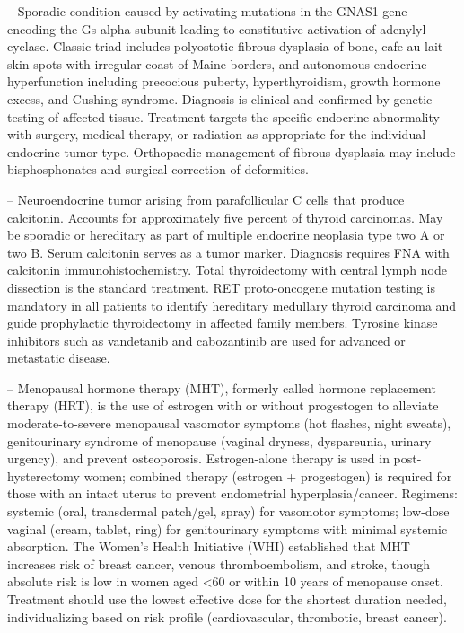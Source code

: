-- Sporadic condition caused by activating mutations in the GNAS1 gene encoding the Gs alpha subunit leading to constitutive activation of adenylyl cyclase. Classic triad includes polyostotic fibrous dysplasia of bone, cafe-au-lait skin spots with irregular coast-of-Maine borders, and autonomous endocrine hyperfunction including precocious puberty, hyperthyroidism, growth hormone excess, and Cushing syndrome. Diagnosis is clinical and confirmed by genetic testing of affected tissue. Treatment targets the specific endocrine abnormality with surgery, medical therapy, or radiation as appropriate for the individual endocrine tumor type. Orthopaedic management of fibrous dysplasia may include bisphosphonates and surgical correction of deformities.

-- Neuroendocrine tumor arising from parafollicular C cells that produce calcitonin. Accounts for approximately five percent of thyroid carcinomas. May be sporadic or hereditary as part of multiple endocrine neoplasia type two A or two B. Serum calcitonin serves as a tumor marker. Diagnosis requires FNA with calcitonin immunohistochemistry. Total thyroidectomy with central lymph node dissection is the standard treatment. RET proto-oncogene mutation testing is mandatory in all patients to identify hereditary medullary thyroid carcinoma and guide prophylactic thyroidectomy in affected family members. Tyrosine kinase inhibitors such as vandetanib and cabozantinib are used for advanced or metastatic disease.

-- Menopausal hormone therapy (MHT), formerly called hormone replacement therapy (HRT), is the use of estrogen with or without progestogen to alleviate moderate-to-severe menopausal vasomotor symptoms (hot flashes, night sweats), genitourinary syndrome of menopause (vaginal dryness, dyspareunia, urinary urgency), and prevent osteoporosis. Estrogen-alone therapy is used in post-hysterectomy women; combined therapy (estrogen + progestogen) is required for those with an intact uterus to prevent endometrial hyperplasia/cancer. Regimens: systemic (oral, transdermal patch/gel, spray) for vasomotor symptoms; low-dose vaginal (cream, tablet, ring) for genitourinary symptoms with minimal systemic absorption. The Women's Health Initiative (WHI) established that MHT increases risk of breast cancer, venous thromboembolism, and stroke, though absolute risk is low in women aged <60 or within 10 years of menopause onset. Treatment should use the lowest effective dose for the shortest duration needed, individualizing based on risk profile (cardiovascular, thrombotic, breast cancer).

